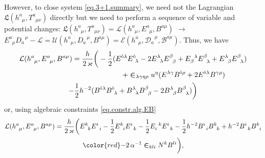 \documentclass[
10pt, %
a4paper, %
oneside, %
headinclude,footinclude, %
BCOR5mm, %
]{scrartcl}
\newcommand{\tetrsymbol}{h}
\newcommand{\tetr}[2]{\tetrsymbol^{#1}_{\phantom{#1}#2}}
\newcommand{\detTetr}{\tetrsymbol}
\newcommand{\Tors}[2]{T^{#1}_{\phantom{a}#2}}
\newcommand{\ET}[2]{E^{#1}_{\phantom{#1}#2}}	%
\newcommand{\ETmix}[2]{E^{#1}_{#2}}	%
\newcommand{\dT}[2]{D_{#1}^{\phantom{#1}\,#2}}	%
\newcommand{\ddT}[2]{\mathcal{D}_{#1}^{\phantom{#1}\,#2}}	%
\newcommand{\BT}[2]{B^{#1#2}}	%
\newcommand{\BTmix}[2]{B^{#1}_{#2}}	%
\newcommand{\bT}[2]{B^{#1#2}}	%
\newcommand{\bbT}[2]{\mathcal{B}^{#1#2}}	%
\newcommand{\Laghodge}{L}%
\newcommand{\Lagtors}{\mathfrak{L}}%
\newcommand{\LagBE}{\mathcal{L}}%
\newcommand{\LagST}{\mathcal{U}}%
\newcommand{\Lagtpo}{\mathcal{E}}%
\newcommand{\LCsymb}{\bm{\in}}    %
\newcommand{\HDT}[1]{\accentset{\star}{T}^{#1}}
\newcommand{\HDmix}{\accentset{\star}{T}}
\newcommand{\indalg}[1]{\hat{\mathsmaller{#1}}}
\newcommand{\Tscal}{\mathcal{T}}		%
\begin{document}


However, to close system \eqref{eq.3+1.summary}, we need not the Lagrangian $ 
\Lagtors(\tetr{a}{\mu},\Tors{a}{\mu\nu})  $ directly but we need to perform a sequence of variable 
and potential changes: $ \Lagtors(\tetr{a}{\mu},\Tors{a}{\mu\nu}) = 
\LagBE(\tetr{a}{\mu},\ET{a}{\mu},\BT{a}{\mu}) $ $ \longrightarrow $ $ \ET{a}{\mu} 
\dT{a}{\mu} - \LagBE = 
\LagST(\tetr{a}{\mu},\dT{a}{\mu},\bT{a}{\mu}) = 
\Lagtpo(\tetr{a}{\mu},\ddT{a}{\mu},\bbT{a}{\mu}) $. 
Thus, we have
\begin{multline}\label{eqn.Tscal.EB}
	\LagBE(\tetr{a}{\mu},\ET{a}{\mu},\BT{a}{\mu}) = \frac{\detTetr}{2 \, \varkappa}
	\bigg(
	-\frac12 (\ETmix{\indalg{0}\lambda}{}\ETmix{\indalg{0}}{\ \lambda} -  
				2\ETmix{\lambda}{\ \,\lambda}\ETmix{\beta}{\ \,\beta} +
		      \ETmix{\ \,\lambda}{\beta} \ETmix{\beta}{\ \,\lambda}  +
			  \ETmix{\lambda}{\ \,\beta}\ETmix{\beta}{\ \,\lambda} )
	          \\
	          \hspace{4cm} + \LCsymb_{\lambda\gamma\eta\rho} u^\eta 
	          (\ETmix{\lambda\gamma}{}\BTmix{\indalg{0}\rho}{} + 2 
	          \ET{\indalg{0}\lambda}{}\BTmix{\gamma\rho}{})
  			  \\
	          - \frac12 h^{-2} ( \BTmix{\indalg{0}\lambda}{}\BTmix{\indalg{0}}{\ \lambda}
	          + \BTmix{\lambda}{\ \,\lambda}\BTmix{\beta}{\ \,\beta}
	          - 2\BTmix{\lambda}{\ \,\beta}\BTmix{\beta}{\ \,\lambda}
	          )
	          \bigg)
\end{multline}
or, using algebraic constraints \eqref{eq.constr.alg.EB}
\begin{multline}\label{eqn.Tscal.EB1}
	\LagBE(\tetr{a}{\mu},\ET{a}{\mu},\BT{a}{\mu}) = \frac{h}{2\,\varkappa} \bigg( 
	 \ETmix{k}{\ \,k}\ETmix{i}{\ \,i} 
	-\frac12 \ETmix{k}{\ \,i} \ETmix{i}{\ \,k}
	-\frac12 \ETmix{\ \,k}{i} \ETmix{i}{\ \,k} 
	-\frac12 \detTetr^{-2} 
	  \BTmix{i}{\ \,i}\BTmix{k}{\ \,k}
	+ \detTetr^{-2} \BTmix{i}{\ \,k}\BTmix{k}{\ \,i} 
	\\
	{\color{red}-} 2 \, \alpha^{-1} \LCsymb_{kli} N^k \BTmix{l i}{}
	\bigg),
\end{multline}
\end{document}

